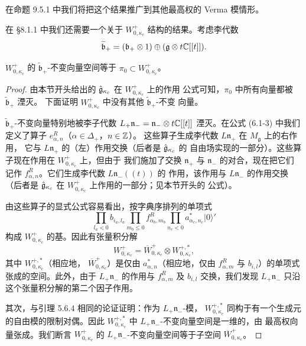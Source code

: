 在命题 9.5.1 中我们将把这个结果推广到其他最高权的 Verma 模情形。

在 \S8.1.1 中我们还需要一个关于 $W^+_{0,\kappa_c}$ 结构的结果。考虑李代数
\[
    \widetilde{\mathfrak b}_+=(\mathfrak b_+\otimes1)
    \oplus(\mathfrak{g}\otimes t\mathbb{C}[[t]]).
\]

\renewcommand{\thelemma}{6.3.4}
\begin{lemma}
    $W^+_{0,\kappa_c}$ 的 $\widetilde{\mathfrak b}_+$-不变向量空间等于
    $\pi_0\subset W^+_{0,\kappa_c}$。
\end{lemma}

\begin{proof}
    由本节开头给出的 $\hat{\mathfrak{g}}_{\kappa_c}$ 在 $W^+_{0,\kappa_c}$ 上的作用
    公式可知，$\pi_0$ 中所有向量都被 $\widetilde{\mathfrak b}_+$ 湮灭。
    下面证明 $W^+_{0,\kappa_c}$ 中没有其他 $\widetilde{\mathfrak b}_+$-不变
    向量。

    $\widetilde{\mathfrak b}_+$-不变向量特别地被李子代数
    $L_+\mathfrak n_-=\mathfrak n_-\otimes t\mathbb{C}[[t]]$ 湮灭。在公式 (6.1-3)
    中我们定义了算子 $e^R_{\alpha,n}$（$\alpha\in\Delta_+$，$n\in\mathbb{Z}$）。
    这些算子生成李代数 $L\mathfrak n_+$ 在 $M_{\mathfrak g}$ 上的右作用，
    它与 $L\mathfrak n_+$ 的（左）作用交换（后者是 $\hat{\mathfrak{g}}_{\kappa_c}$ 的
    自由场实现的一部分）。这些算子现在作用在 $W^+_{0,\kappa_c}$ 上，但由于
    我们施加了交换 $\mathfrak n_+$ 与 $\mathfrak n_-$ 的对合，现在把它们
    记作 $f^R_{\alpha,n}$。它们生成李代数 $L\mathfrak n_-(\!(t)\!)$ 的
    作用，该作用与 $L\mathfrak n_-$ 的作用交换（后者是
    $\hat{\mathfrak{g}}_{\kappa_c}$ 在 $W^+_{0,\kappa_c}$ 上作用的一部分；见本节开头的
    公式）。

    由这些算子的显式公式容易看出，按字典序排列的单项式
    \[
        \prod_{l_a<0}b_{i_a,l_a}\prod_{m_b\le0}f^R_{\alpha_b,m_b}
        \prod_{n_c<0}a^*_{\alpha_c,n_c}|0\rangle'
    \]
    构成 $W^+_{0,\kappa_c}$ 的基。因此有张量积分解
    \[
        W^+_{0,\kappa_c}
        =\overline W^+_{0,\kappa_c}\otimes W^{+,*}_{0,\kappa_c},
    \]
    其中 $W^{+,*}_{0,\kappa_c}$（相应地，
    $\overline W^+_{0,\kappa_c}$）是仅由 $a^*_{\alpha,n}$（相应地，仅由
    $f^R_{\alpha,m}$ 与 $b_{i,l}$）的单项式张成的空间。此外，由于
    $L_+\mathfrak n_-$ 的作用与 $f^R_{\alpha,m}$ 及 $b_{i,l}$ 交换，我们发现
    $L_+\mathfrak n_-$ 只沿这个张量积分解的第二个因子作用。

    其次，与引理 5.6.4 相同的论证证明：作为 $L_+\mathfrak n_-$-模，
    $W^{+,*}_{0,\kappa_c}$ 同构于有一个生成元的自由模的限制对偶。因此
    $W^{+,*}_{0,\kappa_c}$ 中 $L_+\mathfrak n_-$-不变向量空间是一维的，由
    最高权向量张成。我们断言 $W^+_{0,\kappa_c}$ 的
    $L_+\mathfrak n_-$-不变向量空间等于子空间
    $\overline W^+_{0,\kappa_c}$。


\end{proof}
